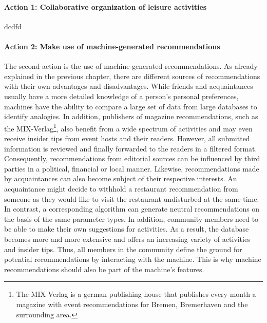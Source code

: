 \documentclass[12pt,numbers=noenddot,parskip,bibliography=totocnumbered,listof=totocnumbered,draft]{scrreprt}
\begin{document}
\paragraph{Action 1: Collaborative organization of leisure activities}
dcdfd

\paragraph{Action 2: Make use of machine-generated recommendations}
The second action is the use of machine-generated recommendations. As already explained in the previous chapter, there are different sources of recommendations with their own advantages and disadvantages. While friends and acquaintances usually have a more detailed knowledge of a person's personal preferences, machines have the ability to compare a large set of data from large databases to identify analogies. In addition, publishers of magazine recommendations, such as the MIX-Verlag\footnote{The MIX-Verlag is a german publishing house that publishes every month a magazine with event recommendations for Bremen, Bremerhaven and the surrounding area.}, also benefit from a wide spectrum of activities and may even receive insider tips from event hosts and their readers. However, all submitted information is reviewed and finally forwarded to the readers in a filtered format. Consequently, recommendations from editorial sources can be influenced by third parties in a political, financial or local manner. Likewise, recommendations made by acquaintances can also become subject of their respective interests. An acquaintance might decide to withhold a restaurant recommendation from someone as they would like to visit the restaurant undisturbed at the same time.\newline
In contrast, a corresponding algorithm can generate neutral recommendations on the basis of the same parameter types. In addition, community members need to be able to make their own suggestions for activities. As a result, the database becomes more and more extensive and offers an increasing variety of activities and insider tips. Thus, all members in the community define the ground for potential recommendations by interacting with the machine. This is why machine recommendations should also be part of the machine's features.
\end{document}

